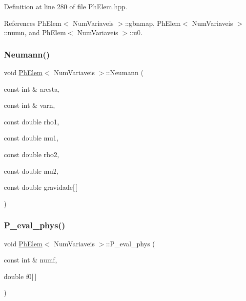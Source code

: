 Definition at line 280 of file Ph\+Elem.\+hpp.



References Ph\+Elem$<$ Num\+Variaveis $>$\+::gbnmap, Ph\+Elem$<$ Num\+Variaveis $>$\+::numn, and Ph\+Elem$<$ Num\+Variaveis $>$\+::u0.

\mbox{\label{classPhElem_a857f4ffbef27f0ef054f59eceffbad27}} 
\subsubsection{\texorpdfstring{Neumann()}{Neumann()}}
{\footnotesize\ttfamily void \hyperlink{classPhElem}{Ph\+Elem}$<$ Num\+Variaveis $>$\+::Neumann (\begin{DoxyParamCaption}\item[{const int \&}]{aresta,  }\item[{const int \&}]{varn,  }\item[{const double}]{rho1,  }\item[{const double}]{mu1,  }\item[{const double}]{rho2,  }\item[{const double}]{mu2,  }\item[{const double}]{gravidade\mbox{[}$\,$\mbox{]} }\end{DoxyParamCaption})\hspace{0.3cm}{\ttfamily [inherited]}}

\mbox{\label{classPhElem_a638d823f66d1600cb948df872eb753c1}} 
\subsubsection{\texorpdfstring{P\+\_\+eval\+\_\+phys()}{P\_eval\_phys()}}
{\footnotesize\ttfamily void \hyperlink{classPhElem}{Ph\+Elem}$<$ Num\+Variaveis $>$\+::P\+\_\+eval\+\_\+phys (\begin{DoxyParamCaption}\item[{const int \&}]{numf,  }\item[{double}]{f0\mbox{[}$\,$\mbox{]} }\end{DoxyParamCaption})\hspace{0.3cm}{\ttfamily [inherited]}}



